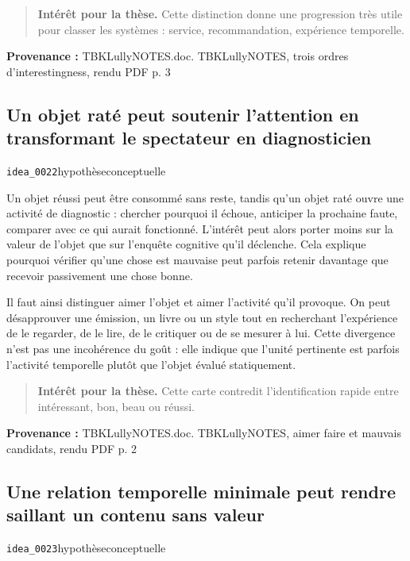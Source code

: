 \documentclass[10pt,a4paper]{article}
\begin{document}
\begin{quote}
\textbf{Intérêt pour la thèse.} Cette distinction donne une progression très utile pour classer les systèmes : service, recommandation, expérience temporelle.
\end{quote}
{\footnotesize\color{metadata}\textbf{Provenance :} TBKLullyNOTES.doc. TBKLullyNOTES, trois ordres d'interestingness, rendu PDF p. 3\par}

\subsection{Un objet raté peut soutenir l'attention en transformant le spectateur en diagnosticien}
{\small\color{metadata} \texttt{idea\_0022}\quad\textbullet\quad hypothèse\quad\textbullet\quad conceptuelle\par}

Un objet réussi peut être consommé sans reste, tandis qu'un objet raté ouvre une activité de diagnostic : chercher pourquoi il échoue, anticiper la prochaine faute, comparer avec ce qui aurait fonctionné. L'intérêt peut alors porter moins sur la valeur de l'objet que sur l'enquête cognitive qu'il déclenche. Cela explique pourquoi vérifier qu'une chose est mauvaise peut parfois retenir davantage que recevoir passivement une chose bonne.

Il faut ainsi distinguer aimer l'objet et aimer l'activité qu'il provoque. On peut désapprouver une émission, un livre ou un style tout en recherchant l'expérience de le regarder, de le lire, de le critiquer ou de se mesurer à lui. Cette divergence n'est pas une incohérence du goût : elle indique que l'unité pertinente est parfois l'activité temporelle plutôt que l'objet évalué statiquement.

\begin{quote}
\textbf{Intérêt pour la thèse.} Cette carte contredit l'identification rapide entre intéressant, bon, beau ou réussi.
\end{quote}
{\footnotesize\color{metadata}\textbf{Provenance :} TBKLullyNOTES.doc. TBKLullyNOTES, aimer faire et mauvais candidats, rendu PDF p. 2\par}

\subsection{Une relation temporelle minimale peut rendre saillant un contenu sans valeur}
{\small\color{metadata} \texttt{idea\_0023}\quad\textbullet\quad hypothèse\quad\textbullet\quad conceptuelle\par}
\end{document}
